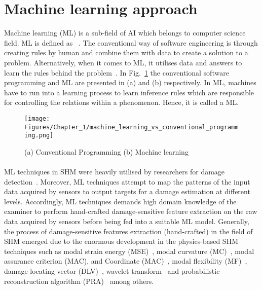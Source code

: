\section{Machine learning approach}
\label{sec31}
Machine learning (ML) is a sub-field of AI which belongs to computer science field. 
ML is defined as ~\cite{munoz2014machine}.
The conventional way of software engineering is through creating rules by human and combine them with data to create a solution to a problem.
Alternatively, when it comes to ML, it utilises data and answers to learn the rules behind the problem~\cite{franoischollet2017learning}.
In Fig.~\ref{fig:Machine_learning} the conventional software programming and ML are presented in (a) and (b) respectively.
In ML, machines have to run into a learning process to learn inference rules which are responsible for controlling the relations within a phenomenon. Hence, it is called a ML.
\begin{figure} [!ht]
	\begin{center}
		\centering
		\texttt{[image: Figures/Chapter\_1/machine\_learning\_vs\_conventional\_programming.png]}
	\end{center}
	\caption{(a) Conventional Programming	(b) Machine learning} 
	\label{fig:Machine_learning}
\end{figure}
\paragraph{}
ML techniques in SHM were heavily utilised by researchers for damage detection~\cite{raghavan2008effects, Su2009, Mitra2016}.
Moreover, ML techniques attempt to map the patterns of the input data acquired by sensors to output targets for a damage estimation at different levels. 
Accordingly, ML techniques demands high domain knowledge of the examiner to perform hand-crafted damage-sensitive feature extraction on the raw data acquired by sensors before being fed into a suitable ML model.
Generally, the process of damage-sensitive features extraction (hand-crafted) in the field of SHM emerged due to the enormous development in the physics-based SHM techniques such as modal strain energy (MSE)~\cite{Kim}, modal curvature (MC)~\cite{Wahab}, modal assurance criterion (MAC), and Coordinate (MAC)~\cite{Allemang2003}, modal flexibility (MF)~\cite{Jaishi}, damage locating vector (DLV)~\cite{Bernal2002}, wavelet transform~\cite{Staszewski,Kima} and probabilistic reconstruction algorithm (PRA)~\cite{Hay2006} among others.

